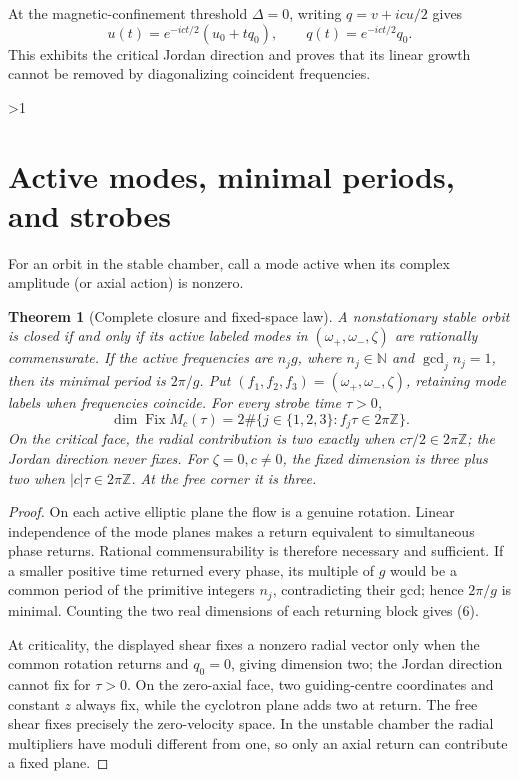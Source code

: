 \documentclass[10pt]{article}
\providecommand{\CRevisionRound}{2}
\newtheorem{theorem}{Theorem}
\newcommand{\Fix}{\operatorname{Fix}}
\begin{document}
At the magnetic-confinement threshold $\Delta=0$, writing
$q=v+icu/2$ gives
\[
 u(t)=e^{-ict/2}(u_0+tq_0),\qquad q(t)=e^{-ict/2}q_0.
\]
This exhibits the critical Jordan direction and proves that its linear growth
cannot be removed by diagonalizing coincident frequencies.
\fi

\ifnum\CRevisionRound>1
\section{Active modes, minimal periods, and strobes}
For an orbit in the stable chamber, call a mode active when its complex
amplitude (or axial action) is nonzero.

\begin{theorem}[Complete closure and fixed-space law]
A nonstationary stable orbit is closed if and only if its active labeled modes
in $(\omega_+,\omega_-,\zeta)$ are rationally commensurate.  If the active
frequencies are $n_jg$, where $n_j\in\mathbb N$ and $\gcd_j n_j=1$, then its
minimal period is $2\pi/g$.  Put $(f_1,f_2,f_3)=(\omega_+,\omega_-,\zeta)$,
retaining mode labels when frequencies coincide.  For every strobe time
$\tau>0$,
\begin{equation}
 \dim\Fix M_c(\tau)=2\#\{j\in\{1,2,3\}:f_j\tau\in2\pi\mathbb Z\}. \tag{6}
\end{equation}
On the critical face, the radial contribution is two exactly when
$c\tau/2\in2\pi\mathbb Z$; the Jordan direction never fixes.  For
$\zeta=0,c\ne0$, the fixed dimension is three plus two when
$|c|\tau\in2\pi\mathbb Z$.  At the free corner it is three.
\end{theorem}

\begin{proof}
On each active elliptic plane the flow is a genuine rotation.  Linear
independence of the mode planes makes a return equivalent to simultaneous
phase returns.  Rational commensurability is therefore necessary and
sufficient.  If a smaller positive time returned every phase, its multiple of
$g$ would be a common period of the primitive integers $n_j$, contradicting
their gcd; hence $2\pi/g$ is minimal.  Counting the two real dimensions of
each returning block gives (6).

At criticality, the displayed shear fixes a nonzero radial vector only when
the common rotation returns and $q_0=0$, giving dimension two; the Jordan
direction cannot fix for $\tau>0$.  On the zero-axial face, two guiding-centre
coordinates and constant $z$ always fix, while the cyclotron plane adds two at
return.  The free shear fixes precisely the zero-velocity space.  In the
unstable chamber the radial multipliers have moduli different from one, so only
an axial return can contribute a fixed plane.
\end{proof}
\end{document}
